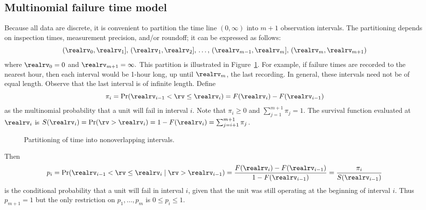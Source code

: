 \subsection{Multinomial failure time model}
\label{section:multinomial.failure.model}
Because all data are discrete, it is convenient to partition the time
line $(0, \infty)$ into $m+1$ observation intervals.  The
partitioning depends on inspection times, measurement precision, and/or
roundoff; it can be expressed as follows:
\begin{equation}
\label{equation:small.intervals}
(\realrv_{0}, \realrv_{1}],\,
(\realrv_{1}, \realrv_{2}],\, \ldots,\,
(\realrv_{m-1}, \realrv_{m}],\,
(\realrv_{m}, \realrv_{m+1})
\end{equation}
where $\realrv_{0}=0$ and $\realrv_{m+1}=\infty.$ This partition
is illustrated in
Figure~\ref{figure:multinomialfig.ps}.  For example, if failure times
are recorded to the nearest hour, then each interval would be 1-hour
long, up until $\realrv_{m}$, the last
recording. In general, these intervals need not be of equal length.
Observe that the last interval is of infinite length. Define
\begin{equation}
\label{equation:def.of.pi}
\pi_{i}=\Pr(\realrv_{i-1} < \rv 
\le \realrv_{i})=F(\realrv_{i})-F(\realrv_{i-1})
\end{equation}
as the multinomial probability that a unit will fail in interval $i$.
Note that $\pi_{i} \geq 0$ and $\sum_{j=1}^{m+1} \pi_{j}=1$.
The survival function evaluated at 
$\realrv_{i}$ is $S(\realrv_{i})=
\Pr(\rv > \realrv_{i})=1-F(\realrv_{i})=\sum_{j=i+1}^{m+1} \pi_{j}$.
\begin{figure}
\caption{Partitioning of time into nonoverlapping intervals.}
\label{figure:multinomialfig.ps}
\end{figure}
Then
\begin{equation}
\label{equation:pvec.def}
p_{i}=\Pr(\realrv_{i-1}<\rv \le \realrv_{i}
\mid  \rv > \realrv_{i-1})
=\frac{F(\realrv_{i})-F(\realrv_{i-1})}
     {1-F(\realrv_{i-1})}
=\frac{\pi_{i}}{S(\realrv_{i-1})}
\end{equation}
is the conditional probability that a unit will 
fail in interval $i$, given that the unit was
still operating at the beginning of interval $i$.
Thus
$p_{m+1}=1$ but the only restriction on 
$p_{1},\ldots,p_{m}$ is $0\leq p_{i} \leq 1$.

